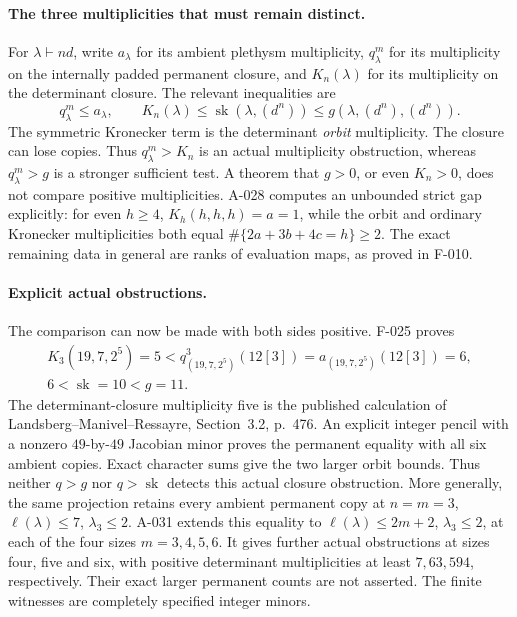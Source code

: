 \documentclass[11pt]{article}
\begin{document}
\paragraph{The three multiplicities that must remain distinct.}
For \(\lambda\vdash nd\), write \(a_\lambda\) for its ambient
plethysm multiplicity, \(q^m_\lambda\) for its multiplicity on the
internally padded permanent closure, and \(K_n(\lambda)\) for
its multiplicity on the determinant closure. The relevant inequalities
are
\[
 q^m_\lambda\leq a_\lambda,\qquad
 K_n(\lambda)\leq\operatorname{sk}(\lambda,(d^n))
                         \leq g(\lambda,(d^n),(d^n)).
\]
The symmetric Kronecker term is the determinant \emph{orbit}
multiplicity. The closure can lose copies. Thus \(q^m_\lambda>K_n\)
is an actual multiplicity obstruction, whereas \(q^m_\lambda>g\)
is a stronger sufficient test. A theorem that \(g>0\), or even
\(K_n>0\), does not compare positive multiplicities. A-028 computes an unbounded strict gap explicitly: for even \(h\geq4\),
\(K_h(h,h,h)=a=1\), while the orbit and ordinary Kronecker
multiplicities both equal \(\#\{2a+3b+4c=h\}\geq2\).
The exact remaining data in general are ranks of evaluation maps,
as proved in F-010.

\paragraph{Explicit actual obstructions.}
The comparison can now be made with both sides positive. F-025 proves
\[
 \begin{gathered}
 K_3(19,7,2^5)=5
 <q^3_{(19,7,2^5)}(12[3])=a_{(19,7,2^5)}(12[3])=6,\\
 6<\operatorname{sk}=10<g=11.
 \end{gathered}
\]
The determinant-closure multiplicity five is the published calculation
of Landsberg--Manivel--Ressayre, Section~3.2, p.~476. An explicit
integer pencil with a nonzero \(49\)-by-\(49\) Jacobian minor proves
the permanent equality with all six ambient copies. Exact character
sums give the two larger orbit bounds. Thus neither \(q>g\) nor
\(q>\operatorname{sk}\) detects this actual closure obstruction.
More generally, the same projection retains every ambient permanent
copy at \(n=m=3\), \(\ell(\lambda)\leq7\), \(\lambda_3\leq2\).
A-031 extends this equality to \(\ell(\lambda)\leq2m+2\),
\(\lambda_3\leq2\), at each of the four sizes \(m=3,4,5,6\).
It gives further actual obstructions at sizes four, five and six,
with positive determinant multiplicities at least \(7,63,594\),
respectively. Their exact larger permanent counts are not asserted.
The finite witnesses are completely specified integer minors.
\end{document}

